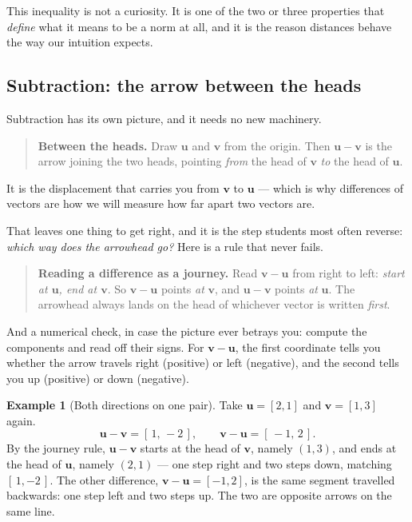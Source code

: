 \documentclass[11pt]{article}
\theoremstyle{definition}
\newtheorem{ex}{Example}[section]
\theoremstyle{remark}
\newcommand{\vc}[1]{\mathbf{#1}}
\begin{document}
\noindent This inequality is not a curiosity. It is one of the two or three
properties that \emph{define} what it means to be a norm at all, and it is the
reason distances behave the way our intuition expects.

\subsection{Subtraction: the arrow between the heads}
Subtraction has its own picture, and it needs no new machinery.

\begin{quote}
\textbf{Between the heads.} Draw $\vc{u}$ and $\vc{v}$ from the origin. Then
$\vc{u}-\vc{v}$ is the arrow joining the two heads, pointing \emph{from} the
head of $\vc{v}$ \emph{to} the head of $\vc{u}$.
\end{quote}

\noindent It is the displacement that carries you from $\vc{v}$ to $\vc{u}$ ---
which is why differences of vectors are how we will measure how far apart two
vectors are.

\smallskip
\noindent That leaves one thing to get right, and it is the step students most
often reverse: \emph{which way does the arrowhead go?} Here is a rule that never
fails.

\begin{quote}
\textbf{Reading a difference as a journey.} Read $\vc{v}-\vc{u}$ from right to
left: \emph{start at $\vc{u}$, end at $\vc{v}$}. So $\vc{v}-\vc{u}$ points
\emph{at} $\vc{v}$, and $\vc{u}-\vc{v}$ points \emph{at} $\vc{u}$. The arrowhead
always lands on the head of whichever vector is written \emph{first}.
\end{quote}

\noindent And a numerical check, in case the picture ever betrays you: compute
the components and read off their signs. For $\vc{v}-\vc{u}$, the first
coordinate tells you whether the arrow travels right (positive) or left
(negative), and the second tells you up (positive) or down (negative).

\begin{ex}[Both directions on one pair]
Take $\vc{u}=[2,1]$ and $\vc{v}=[1,3]$ again.
\[
  \vc{u}-\vc{v}=[\,1,\,-2\,],
  \qquad
  \vc{v}-\vc{u}=[\,-1,\,2\,].
\]
By the journey rule, $\vc{u}-\vc{v}$ starts at the head of $\vc{v}$, namely
$(1,3)$, and ends at the head of $\vc{u}$, namely $(2,1)$ --- one step right and
two steps down, matching $[\,1,-2\,]$. The other difference,
$\vc{v}-\vc{u}=[-1,2]$, is the same segment travelled backwards: one step left
and two steps up. The two are opposite arrows on the same line.
\end{ex}
\end{document}
